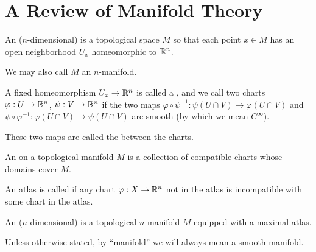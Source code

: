 \documentclass[../main.tex]{subfiles}
\begin{document}
\section{A Review of Manifold Theory}

\begin{defn}
  An ($n$-dimensional)  is a topological space $M$ so that
  each point $x \in M$ has an open neighborhood $U_x$ homeomorphic to $\mathbb{R}^n$.

  We may also call $M$ an $n$-manifold.
\end{defn}


A fixed homeomorphism $U_x \to \mathbb{R}^n$ is called a , and
we call two charts $\varphi : U \to \mathbb{R}^n$, $\psi : V \to \mathbb{R}^n$ 
 if the two maps 
$\varphi \circ \psi^{-1} : \psi(U \cap V) \to \varphi(U \cap V)$ and 
$\psi \circ \varphi^{-1} : \varphi(U \cap V) \to \psi(U \cap V)$ are 
smooth (by which we mean $C^\infty$).

These two maps are called the  between
the charts. 


\begin{defn}
  An  on a topological manifold $M$ is a collection of 
  compatible charts whose domains cover $M$.

  An atlas is called  if any chart $\varphi : X \to \mathbb{R}^n$
  not in the atlas is incompatible with some chart in the atlas.
\end{defn}

\begin{defn}
  An ($n$-dimensional)  is a topological 
  $n$-manifold $M$ equipped with a maximal atlas. 

  Unless otherwise stated, by ``manifold'' we will always mean a smooth
  manifold. 
\end{defn}
\end{document}
